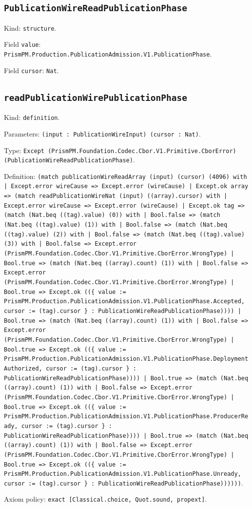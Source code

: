 \documentclass[11pt]{article}
\begin{document}
\subsection*{\texttt{PublicationWireReadPublicationPhase}}
\noindent Kind: \texttt{structure}.\par
\noindent Field \texttt{value}: \texttt{PrismPM.Production.PublicationAdmission.V1.PublicationPhase}.\par
\noindent Field \texttt{cursor}: \texttt{Nat}.\par
\subsection*{\texttt{readPublicationWirePublicationPhase}}
\noindent Kind: \texttt{definition}.\par
\noindent Parameters: \texttt{(input : PublicationWireInput) (cursor : Nat)}.\par
\noindent Type: \texttt{Except (PrismPM.Foundation.Codec.Cbor.V1.Primitive.CborError) (PublicationWireReadPublicationPhase)}.\par
\noindent Definition: \texttt{(match publicationWireReadArray (input) (cursor) (4096) with | Except.error wireCause => Except.error (wireCause) | Except.ok array => (match readPublicationWireNat (input) ((array).cursor) with | Except.error wireCause => Except.error (wireCause) | Except.ok tag => (match (Nat.beq ((tag).value) (0)) with | Bool.false => (match (Nat.beq ((tag).value) (1)) with | Bool.false => (match (Nat.beq ((tag).value) (2)) with | Bool.false => (match (Nat.beq ((tag).value) (3)) with | Bool.false => Except.error (PrismPM.Foundation.Codec.Cbor.V1.Primitive.CborError.WrongType) | Bool.true => (match (Nat.beq ((array).count) (1)) with | Bool.false => Except.error (PrismPM.Foundation.Codec.Cbor.V1.Primitive.CborError.WrongType) | Bool.true => Except.ok ((\{ value := PrismPM.Production.PublicationAdmission.V1.PublicationPhase.Accepted, cursor := (tag).cursor \} : PublicationWireReadPublicationPhase)))) | Bool.true => (match (Nat.beq ((array).count) (1)) with | Bool.false => Except.error (PrismPM.Foundation.Codec.Cbor.V1.Primitive.CborError.WrongType) | Bool.true => Except.ok ((\{ value := PrismPM.Production.PublicationAdmission.V1.PublicationPhase.DeploymentAuthorized, cursor := (tag).cursor \} : PublicationWireReadPublicationPhase)))) | Bool.true => (match (Nat.beq ((array).count) (1)) with | Bool.false => Except.error (PrismPM.Foundation.Codec.Cbor.V1.Primitive.CborError.WrongType) | Bool.true => Except.ok ((\{ value := PrismPM.Production.PublicationAdmission.V1.PublicationPhase.ProducerReady, cursor := (tag).cursor \} : PublicationWireReadPublicationPhase)))) | Bool.true => (match (Nat.beq ((array).count) (1)) with | Bool.false => Except.error (PrismPM.Foundation.Codec.Cbor.V1.Primitive.CborError.WrongType) | Bool.true => Except.ok ((\{ value := PrismPM.Production.PublicationAdmission.V1.PublicationPhase.Unready, cursor := (tag).cursor \} : PublicationWireReadPublicationPhase))))))}.\par
\noindent Axiom policy: \texttt{exact [Classical.choice, Quot.sound, propext]}.\par
\end{document}
